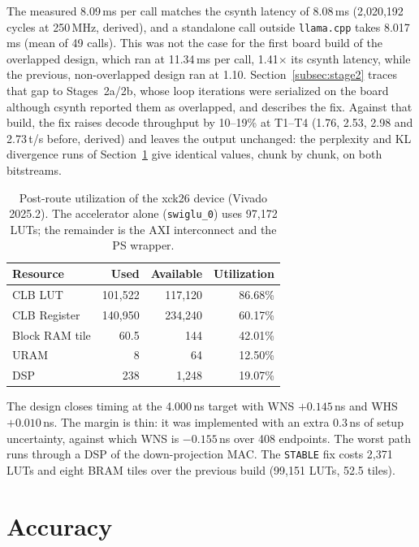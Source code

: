The measured 8.09\,ms per call matches the csynth latency of 8.08\,ms (2,020,192 cycles
at 250\,MHz, derived), and a standalone call outside \texttt{llama.cpp} takes 8.017\,ms
(mean of 49 calls). This was not the case for the first board build of the overlapped
design, which ran at 11.34\,ms per call, 1.41$\times$ its csynth latency, while the
previous, non-overlapped design ran at 1.10. Section~\ref{subsec:stage2} traces that
gap to Stages~2a/2b, whose loop iterations were serialized on the board although csynth
reported them as overlapped, and describes the fix. Against that build, the fix raises
decode throughput by 10--19\% at T1--T4 (1.76, 2.53, 2.98 and 2.73\,t/s before,
derived) and leaves the output unchanged: the perplexity and KL divergence runs of
Section~\ref{sec:accuracy} give identical values, chunk by chunk, on both bitstreams.

\begin{table}[htbp]
\centering
\footnotesize
\caption{Post-route utilization of the xck26 device (Vivado 2025.2). The accelerator
alone (\texttt{swiglu\_0}) uses 97,172 LUTs; the remainder is the AXI interconnect and
the PS wrapper.}
\label{tab:utilization}
\begin{tabular}{l r r r}
\hline
Resource & Used & Available & Utilization \\
\hline
CLB LUT        & 101,522 & 117,120 & 86.68\% \\
CLB Register   & 140,950 & 234,240 & 60.17\% \\
Block RAM tile & 60.5    & 144     & 42.01\% \\
URAM           & 8       & 64      & 12.50\% \\
DSP            & 238     & 1,248   & 19.07\% \\
\hline
\end{tabular}
\end{table}

The design closes timing at the 4.000\,ns target with WNS $+0.145$\,ns and WHS
$+0.010$\,ns. The margin is thin: it was implemented with an extra 0.3\,ns of setup
uncertainty, against which WNS is $-0.155$\,ns over 408 endpoints. The worst path runs
through a DSP of the down-projection MAC. The \texttt{STABLE} fix costs 2,371 LUTs and
eight BRAM tiles over the previous build (99,151 LUTs, 52.5 tiles).

\section{Accuracy}
\label{sec:accuracy}

